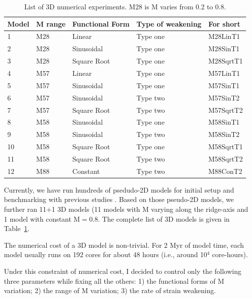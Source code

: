 \begin{table}[h]
\centering
\begin{tabular}{l l l l l}
\hline
\hline
Model& M range & Functional Form & Type of weakening & For short \\ 
\hline
1    &  M28    &   Linear        & Type one   &  M28LinT1\\
\hline
2    &  M28    &   Sinusoidal    & Type one   &  M28SinT1\\
\hline
3    &  M28    &   Square Root   & Type one   &  M28SqrtT1 \\
\hline
4    &  M57    &   Linear        & Type one   &  M57LinT1 \\
\hline
5    &  M57    &   Sinusoidal    & Type one   &  M57SinT1 \\
\hline
6    &  M57    &   Sinusoidal    & Type two   &  M57SinT2 \\
\hline
7    &  M57    &   Square Root   & Type two   &  M57SqrtT2  \\
\hline
8    &  M58    &   Sinusoidal    & Type one   &  M58SinT1  \\
\hline
9    &  M58    &   Sinusoidal    & Type two   &  M58SinT2   \\
\hline
10   &  M58    &   Square Root   & Type one   &  M58SqrtT1   \\
\hline
11   &  M58    &   Square Root   & Type two   &  M58SqrtT2   \\
\hline
12   &  M88    &   Constant      & Type two   &  M88ConT2 \\
\hline
\hline
\end{tabular}
\caption{List of 3D numerical experiments. M28 is M varies from 0.2 to 0.8.}
\label{Tab1_1}
\end{table}

Currently, we have run hundreds of psedudo-2D models for initial setup and benchmarking with previous studies \citep[e.g.,][]{Buck2005, Tucholke2008}. Based on those pseudo-2D models, we further ran 11$+$1 3D models (11 models with M varying along the ridge-axis and 1 model with constant M$=0.8$. The complete list of 3D models is given in Table~\hyperref[Tab1_1]{\ref{Tab1_1}}. 

The numerical cost of a 3D model is non-trivial. For 2 Myr of model time, each model usually runs on 192 cores for about 48 hours (i.e., around 10$^{4}$ core-hours). %

Under this constraint of numerical cost, I decided to control only the following three parameters while fixing all the others: 1) the functional forms of M variation; 2) the range of M variation; 3) the rate of strain weakening. 

